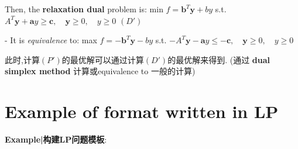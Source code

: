 \documentclass[9pt]{article}
\begin{document}
\qquad Then, the \textbf{relaxation dual} problem is: min $f=\mathbf{b}^T\mathbf{y}+by$ \quad s.t. $A^T\mathbf{y}+\mathbf{a}y\geq \mathbf{c}, \quad\mathbf{y}\geq0, \quad y\geq0$ \quad $(D')$

\qquad - It is \textit{equivalence} to: max $f=-\mathbf{b}^T\mathbf{y}-by$ \quad s.t. $-A^T\mathbf{y}-\mathbf{a}y\leq -\mathbf{c}, \quad\mathbf{y}\geq0, \quad y\geq0$

\qquad 此时,计算$(P')$的最优解可以通过计算$(D')$的最优解来得到. {\footnotesize (通过 \textbf{dual simplex method} 计算或equivalence to 一般的计算)}


\section{Example of format written in LP}

\textbf{Example|构建LP问题模板}:
\end{document}
